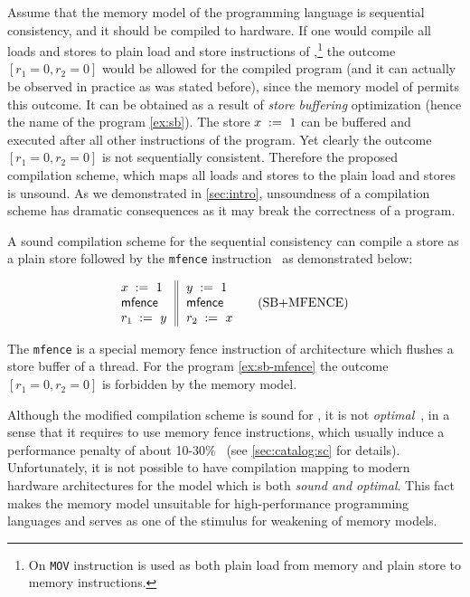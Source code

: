Assume that the memory model of the programming language
is sequential consistency, and 
it should be compiled to \Intel hardware. 
If one would compile all loads and stores 
to plain load and store instructions of \Intel,\footnote{
On \Intel \texttt{MOV} instruction 
is used as both plain load from memory and 
plain store to memory instructions.}
the outcome $[r_1=0, r_2=0]$ would be 
allowed for the compiled program 
(and it can actually be observed in practice as was stated before), 
since the memory model of \Intel permits this outcome. 
It can be obtained as a result of \emph{store buffering}
optimization (hence the name of the program \ref{ex:sb}). 
The store ${x\;:=_{}\;1}$ can be buffered and 
executed after all other instructions of the program.  
Yet clearly the outcome ${[r_1=0, r_2=0]}$ is not sequentially consistent. 
Therefore the proposed compilation scheme, 
which maps all loads and stores to the 
plain load and stores is unsound. 
As we demonstrated in \cref{sec:intro}, 
unsoundness of a compilation scheme has 
dramatic consequences as it may break 
the correctness of a program. 

A sound compilation scheme for the sequential consistency 
can compile a store as a plain store followed 
by the \texttt{mfence} instruction~\cite{Sewell-al:CACM10, Batty-al:POPL11} 
as demonstrated below: 

\begin{equation*}
\inarrII{
   \writeInst{}{x}{1}   \\
   \mfenceInst          \\
   \readInst{}{r_1}{y}  \\
}{
  \writeInst{}{y}{1}   \\
  \mfenceInst          \\
  \readInst{}{r_2}{x}  \\
}
\tag{SB+MFENCE}\label{ex:sb-mfence}
\end{equation*}


The \texttt{mfence} is a special memory fence instruction
of \Intel architecture which flushes a store buffer of a thread. 
For the program \ref{ex:sb-mfence} the outcome $[r_1=0, r_2=0]$
is forbidden by the \Intel memory model. 

Although the modified compilation scheme is sound for \SC, 
it is not \emph{optimal}~\cite{OptimalCompilationCPP}, 
in a sense that it requires to use memory fence instructions, 
which usually induce a performance penalty
of about 10-30\%~\cite{Marino-al:PLDI11, Liu-al:OOPSLA17}
(see \cref{sec:catalog:sc} for details).
Unfortunately, it is not possible to have compilation mapping 
to modern hardware architectures     
for the \SC model which is both \emph{sound and optimal}. 
This fact makes the \SC memory model unsuitable  
for high-performance programming languages
and serves as one of the stimulus for 
weakening of memory models. 
 
